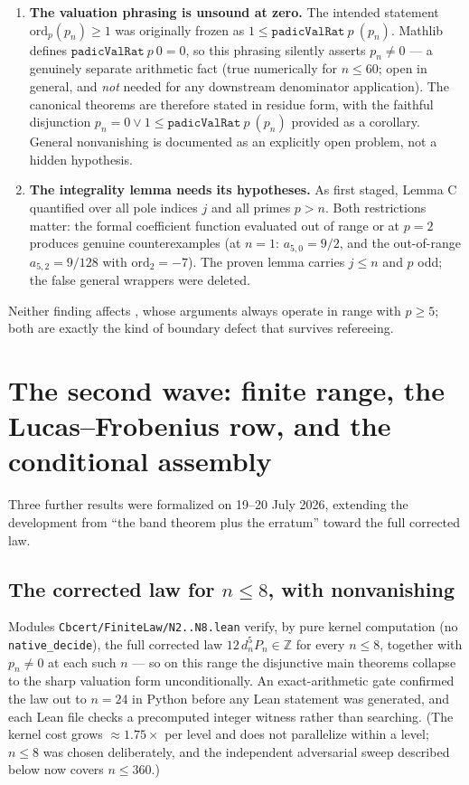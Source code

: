 \documentclass[11pt]{article}
\theoremstyle{definition}
\newcommand{\Z}{\mathbb{Z}}
\newcommand{\lean}[1]{\texttt{#1}}
\begin{document}
\begin{enumerate}[label=\textup{(\arabic*)}]
\item \textbf{The valuation phrasing is unsound at zero.} The intended
statement $\mathrm{ord}_p(p_n) \ge 1$ was originally frozen as
$1 \le \lean{padicValRat}\ p\ (p_n)$. Mathlib defines
$\lean{padicValRat}\ p\ 0 = 0$, so this phrasing silently asserts
$p_n \ne 0$ --- a genuinely separate arithmetic fact (true numerically for
$n \le 60$; open in general, and \emph{not} needed for any downstream
denominator application). The canonical theorems are therefore stated in
residue form, with the faithful disjunction
$p_n = 0 \vee 1 \le \lean{padicValRat}\ p\ (p_n)$ provided as a corollary.
General nonvanishing is documented as an explicitly open problem, not a
hidden hypothesis.
\item \textbf{The integrality lemma needs its hypotheses.} As first staged,
Lemma C quantified over all pole indices $j$ and all primes $p > n$. Both
restrictions matter: the formal coefficient function evaluated out of range
or at $p = 2$ produces genuine counterexamples (at $n = 1$:
$a_{5,0} = 9/2$, and the out-of-range $a_{5,2} = 9/128$ with
$\mathrm{ord}_2 = -7$). The proven lemma carries $j \le n$ and $p$ odd; the
false general wrappers were deleted.
\end{enumerate}

Neither finding affects \cite{CBcert}, whose arguments always operate in
range with $p \ge 5$; both are exactly the kind of boundary defect that
survives refereeing.

\section{The second wave: finite range, the Lucas--Frobenius row, and the
conditional assembly}\label{sec:wave2}

Three further results were formalized on 19--20 July 2026, extending the
development from ``the band theorem plus the erratum'' toward the full
corrected law.

\subsection*{The corrected law for $n \le 8$, with nonvanishing}

Modules \lean{Cbcert/FiniteLaw/N2..N8.lean} verify, by pure kernel
computation (no \lean{native\_decide}), the full corrected law
$12\,d_n^5 P_n \in \Z$ for every $n \le 8$, together with $p_n \ne 0$ at each
such $n$ --- so on this range the disjunctive main theorems collapse to the
sharp valuation form unconditionally. An exact-arithmetic gate confirmed the
law out to $n = 24$ in Python before any Lean statement was generated, and
each Lean file checks a precomputed integer witness rather than searching.
(The kernel cost grows $\approx 1.75\times$ per level and does not
parallelize within a level; $n \le 8$ was chosen deliberately, and the
independent adversarial sweep described below now covers $n \le 360$.)
\end{document}
